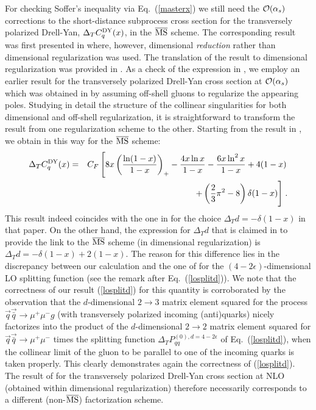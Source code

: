 For checking Soffer's inequality via Eq.~(\ref{masterx}) we still need
the ${\cal O} (\alpha_s)$ corrections to the short-distance subprocess cross 
section for the transversely polarized Drell-Yan, $\Delta_T C_q^{{\small
{\rm DY}}} (x)$, in the $\overline{{\mbox{\rm MS}}}$ scheme.
The corresponding result was first presented in \cite{cont1} where,
however, dimensional {\em reduction} rather than dimensional regularization
was used. The translation of the result to dimensional regularization was
provided in \cite{basim}. As a check of the expression in \cite{basim}, we 
employ an earlier result for the transversely polarized Drell-Yan 
cross section at ${\cal O} (\alpha_s)$ which was obtained in \cite{alex}
by assuming off-shell gluons to regularize the appearing poles. Studying 
in detail the structure of the collinear singularities for both dimensional 
and off-shell regularization, it is straightforward to transform the result
from one regularization scheme to the other. Starting from the result
in \cite{alex}, we obtain in this way for the $\overline{{\mbox{\rm MS}}}$ 
scheme:
\begin{eqnarray} \label{cqdy}
\Delta_T C_q^{{\small {\rm DY}}} (x) &=& C_F \left[ 8x \left( 
\frac{\ln (1-x)}{1-x} \right)_+ - \frac{4 x \ln x}{1-x}-\frac{6 x 
\ln^2 x}{1-x} + 4 (1-x) \right. \nonumber \\
&& \hspace*{0.9cm} + \left( \frac{2}{3} \pi^2 -8 \right) \delta (1-x) 
\Bigg] \; .
\end{eqnarray}
This result indeed coincides with the one in \cite{basim} for the choice
$\Delta_T d= - \delta (1-x)$ in that paper. On the other hand, the 
expression for $\Delta_T d$ that is claimed in \cite{basim} to provide 
the link to the $\overline{{\mbox{\rm MS}}}$ scheme (in dimensional 
regularization) is $\Delta_T d=-\delta (1-x) + 2 (1-x)$. The reason for this 
difference lies in the discrepancy between our calculation and 
the one of \cite{basim} for the $(4-2\epsilon)$-dimensional LO splitting 
function (see the remark after Eq.~(\ref{losplitd})). We note that
the correctness of our result (\ref{losplitd}) for this quantity is 
corroborated by the observation that the $d$-dimensional $2\rightarrow 3$ 
matrix element squared for the process $\vec{q}\vec{\bar{q}} \rightarrow 
\mu^+ \mu^- g$ (with transversely polarized incoming (anti)quarks) nicely 
factorizes into the product of the $d$-dimensional $2\rightarrow 2$ matrix 
element squared for $\vec{q}\vec{\bar{q}} \rightarrow \mu^+ \mu^-$ times the 
splitting function $\Delta_T P_{qq}^{(0),d=4-2 \epsilon}$ of 
Eq.~(\ref{losplitd}), when the collinear limit of the gluon to be parallel
to one of the incoming quarks is taken properly. This clearly demonstrates
again the correctness of (\ref{losplitd}). The result of \cite{basim} 
for the transversely polarized Drell-Yan cross section at NLO (obtained 
within dimensional regularization) therefore necessarily corresponds to a 
different (non-$\overline{{\mbox{\rm MS}}}$) factorization scheme.

